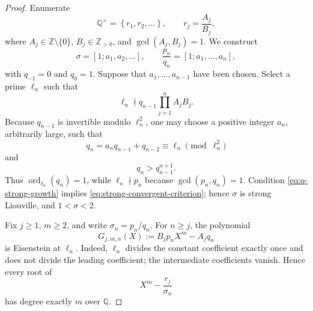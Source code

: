 \documentclass[11pt]{amsart}
\numberwithin{equation}{section}
\theoremstyle{definition}
\theoremstyle{remark}
\newcommand{\Q}{\mathbb Q}
\newcommand{\Z}{\mathbb Z}
\newcommand{\ord}{\operatorname{ord}}
\newcommand{\set}[1]{\left\{#1\right\}}
\begin{document}
\begin{proof}
Enumerate
\[
\Q^\times=\set{r_1,r_2,\ldots},
\qquad
r_j=\frac{A_j}{B_j},
\]
where \(A_j\in\Z\setminus\{0\}\), \(B_j\in\Z_{>0}\), and
\(\gcd(A_j,B_j)=1\). We construct
\[
\sigma=[1;a_1,a_2,\ldots],
\qquad
\frac{p_n}{q_n}=[1;a_1,\ldots,a_n],
\]
with \(q_{-1}=0\) and \(q_0=1\). Suppose that
\(a_1,\ldots,a_{n-1}\) have been chosen. Select a prime
\(\ell_n\) such that
\begin{equation}\label{eq:ell-avoidance}
\ell_n\nmid q_{n-1}\prod_{j=1}^nA_jB_j.
\end{equation}
Because \(q_{n-1}\) is invertible modulo \(\ell_n^2\), one may choose a
positive integer \(a_n\), arbitrarily large, such that
\begin{equation}\label{eq:ell-valuation}
q_n=a_nq_{n-1}+q_{n-2}
\equiv\ell_n\pmod{\ell_n^2}
\end{equation}
and
\begin{equation}\label{eq:q-strong-growth}
q_n>q_{n-1}^{n+1}.
\end{equation}
Thus \(\ord_{\ell_n}(q_n)=1\), while
\(\ell_n\nmid p_n\) because \(\gcd(p_n,q_n)=1\). Condition
\eqref{eq:q-strong-growth} implies
\eqref{eq:strong-convergent-criterion}; hence \(\sigma\) is strong
Liouville, and \(1<\sigma<2\).

Fix \(j\geq1\), \(m\geq2\), and write
\(\sigma_n=p_n/q_n\). For \(n\geq j\), the polynomial
\begin{equation}\label{eq:Eisenstein-polynomial}
G_{j,m,n}(X):=B_jp_nX^m-A_jq_n
\end{equation}
is Eisenstein at \(\ell_n\). Indeed, \(\ell_n\) divides the constant
coefficient exactly once and does not divide the leading coefficient;
the intermediate coefficients vanish. Hence every root of
\[
X^m-\frac{r_j}{\sigma_n}
\]
has degree exactly \(m\) over \(\Q\).


\end{proof}
\end{document}
